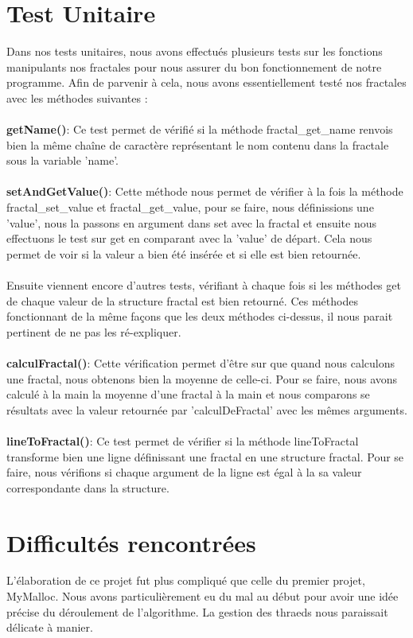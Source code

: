\documentclass[11pt]{article}
\begin{document}
\section{Test Unitaire}

Dans nos tests unitaires, nous avons effectués plusieurs tests sur les fonctions manipulants nos fractales pour nous assurer du bon fonctionnement de notre programme. Afin de parvenir à cela, nous avons essentiellement testé nos fractales avec les méthodes suivantes :
\\
\\
\textbf{getName()}: Ce test permet de vérifié si la méthode fractal\_get\_name renvois bien la même chaîne de caractère représentant le nom contenu dans la fractale sous la variable 'name'.
\\
\\
\textbf{setAndGetValue()}: Cette méthode nous permet de vérifier à la fois la méthode fractal\_set\_value et fractal\_get\_value, 
pour se faire, nous définissions une 'value', nous la passons en argument dans set avec la fractal et ensuite nous effectuons le test sur get en comparant avec la 'value' de départ. Cela nous permet de voir si la valeur a bien été insérée et si elle est bien retournée.
\\
\\
Ensuite viennent encore d'autres tests, vérifiant à chaque fois si les méthodes get de chaque valeur de la structure fractal est bien retourné. Ces méthodes fonctionnant de la même façons que les deux méthodes ci-dessus, il nous parait pertinent de ne pas les ré-expliquer.
\\
\\
\textbf{calculFractal()}: Cette vérification permet d'être sur que quand nous calculons une fractal, nous obtenons bien la moyenne de celle-ci. Pour se faire, nous avons calculé à la main la moyenne d'une fractal à la main et nous comparons se résultats avec la valeur retournée par 'calculDeFractal' avec les mêmes arguments.
\\
\\
\textbf{lineToFractal()}: Ce test permet de vérifier si la méthode lineToFractal transforme bien une ligne définissant une fractal en une structure fractal. Pour se faire, nous vérifions si chaque argument de la ligne est égal à la sa valeur correspondante dans la structure.

\section{Difficultés rencontrées}
L'élaboration de ce projet fut plus compliqué que celle du premier projet, MyMalloc. Nous avons particulièrement eu du mal au début pour avoir une idée précise du déroulement de l'algorithme. La gestion des thraeds nous paraissait délicate à manier. 
\\
\\
\end{document}
